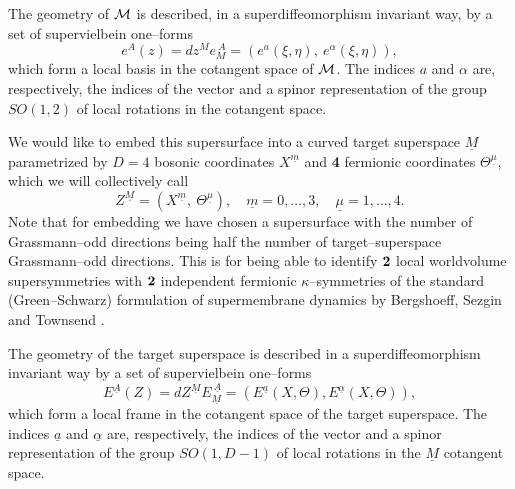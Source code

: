 \documentclass[a4paper,12pt]{article}
\begin{document}
The geometry of ${\cal M}$ is described, in a superdiffeomorphism
invariant way, by a set of supervielbein one--forms
\begin{equation}\label{e}
e^A(z)=dz^Me^{~A}_M=\left(e^a(\xi,\eta),~e^\alpha(\xi,\eta)\right),
\end{equation}
which form a local basis in the cotangent space of ${\cal M}$. The
indices $a$ and $\alpha$ are, respectively, the indices of the
vector and a spinor representation of the group $SO(1,2)$ of local
rotations in the cotangent space.

We would like to embed this supersurface into a curved target
superspace
$\underline M$ parametrized by $D=4$ bosonic coordinates
$X^{\underline m}$ and {\bf 4} fermionic coordinates
$\Theta^{\underline\mu}$, which we will collectively call
\begin{equation}\label{Z}
Z^{\underline M}=(X^{\underline m},~\Theta^{\underline\mu}), \quad
\underline m=0,\dots,3, \quad \underline\mu=1,\dots,4.
\end{equation}
Note that for embedding we have chosen a supersurface with the
number of Grassmann--odd directions being half the number of
target--superspace Grass\-mann--odd directions. This is for being
able to identify ${\bf 2}$ local worldvolume supersymmetries with
${\bf 2}$ independent fermionic $\kappa$--symmetries of the standard
(Green--Schwarz) formulation of supermembrane dynamics by
Bergshoeff, Sezgin and Townsend \cite{bst1}.

The geometry of the target superspace is described in a
superdiffeomorphism invariant way by a set of supervielbein
one--forms
\begin{equation}\label{E}
E^{\underline A}(Z)=dZ^{\underline M}E^{~\underline A}_{\underline
M}=\left( E^{\underline a}(X,\Theta), E^{\underline
\alpha}(X,\Theta)\right),
\end{equation}
which form a local frame in the cotangent space of the target
superspace. The indices $\underline a$ and $\underline\alpha$ are,
respectively, the indices of the vector and a spinor
representation of the group $SO(1,D-1)$ of local rotations in the
$\underline M$ cotangent space.
\end{document}
